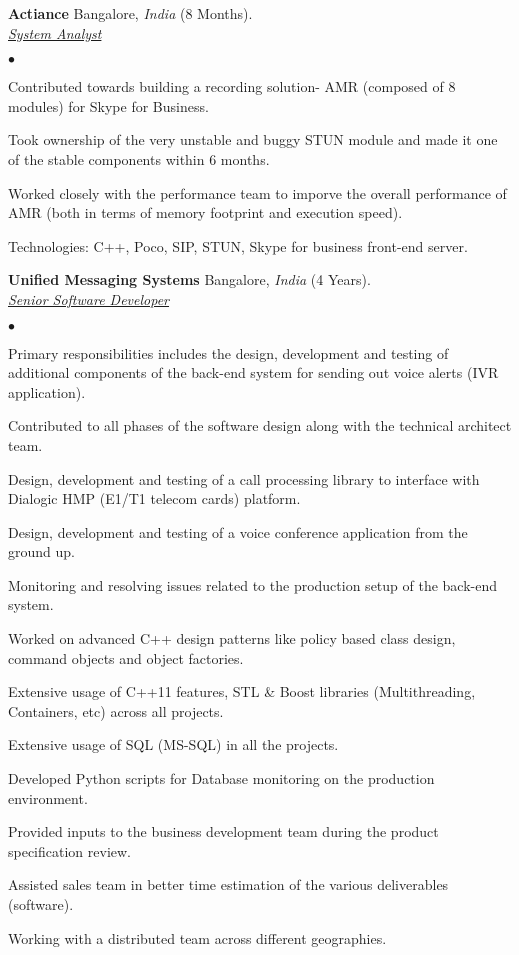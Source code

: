 \documentclass[a4paper]{article}
\newcommand{\employer}[4]{{ \textbf{#1} #2  (#3).\\ \underline{\emph{#4}}\\  }}
\newenvironment{achievements}{\begin{list}{$\bullet$}{\topsep 0pt \itemsep -2pt}}{\vspace*{4pt}\end{list}}
\begin{document}
\employer{Actiance} {Bangalore, \textit{India}} {8 Months} {System Analyst}
	\begin{achievements}
          \item Contributed towards building a recording solution- AMR (composed of 8 modules) for Skype for Business.
          \item Took ownership of the very unstable and buggy STUN module and made it one of the stable components within 6 months.
          \item Worked closely with the performance team to imporve the overall performance of AMR (both in terms of memory footprint and execution speed).
          \item Technologies: C++, Poco, SIP, STUN, Skype for business front-end server.
	\end{achievements}

\employer{Unified Messaging Systems} {Bangalore, \textit{India}} {4 Years} {Senior Software Developer}
	\begin{achievements}
	  \item Primary responsibilities includes the design, development and testing of additional components of the back-end system for sending out voice alerts (IVR application).
	  \item Contributed to all phases of the software design along with the technical architect team.
	  \item Design, development and testing of a call processing library to interface with Dialogic HMP (E1/T1 telecom cards) platform.
	  \item Design, development and testing of a voice conference application from the ground up.
	  \item Monitoring and resolving issues related to the production setup of the back-end system.
	  \item Worked on advanced C++ design patterns like policy based class design, command objects and object factories.
	  \item Extensive usage of C++11 features, STL \& Boost libraries (Multithreading, Containers, etc) across all projects.
	  \item Extensive usage of SQL (MS-SQL) in all the projects.
	  \item Developed Python scripts for Database monitoring on the production environment.
	  \item Provided inputs to the business development team during the product specification review.
	  \item Assisted sales team in better time estimation of the various deliverables (software).
	  \item Working with a distributed team across different geographies.
	\end{achievements}
\end{document}
